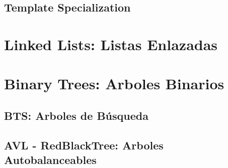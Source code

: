 \documentclass[12pt, fleqn]{report}                             %
\theoremstyle{break}                                            %
\begin{document}
        \clearpage
        \section{Template Specialization}

    \clearpage
    \chapter{Linked Lists: Listas Enlazadas}

    \clearpage
    \chapter{Binary Trees: Arboles Binarios}

        \section{BTS: Arboles de Búsqueda}

        \section{AVL - RedBlackTree: Arboles Autobalanceables}

\end{document}
